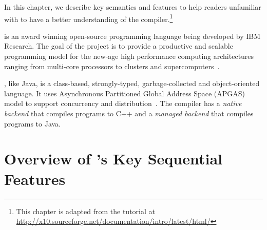 
In this chapter, we describe key \xten semantics and features to help readers 
unfamiliar with \xten to
have a better understanding of the \mixten compiler.\footnote{This chapter is
adapted from the tutorial at
\url{http://x10.sourceforge.net/documentation/intro/latest/html/}}   

\xten is an award winning open-source programming language being developed by
IBM Research. The goal of the \xten project is to provide a productive and
scalable programming model for the new-age high performance computing
architectures ranging from multi-core processors to clusters and
supercomputers~\cite{x10}. 

\xten, like Java, is a class-based, strongly-typed, garbage-collected and
object-oriented language. It uses Asynchronous Partitioned Global Address 
Space (APGAS)
model to support concurrency and distribution~\cite{specs}. The \xten compiler has a
\emph{native backend} that compiles \xten programs to C++ and a 
\emph{managed backend} that
compiles \xten programs to Java. 


\section{Overview of \xten's Key Sequential Features}

